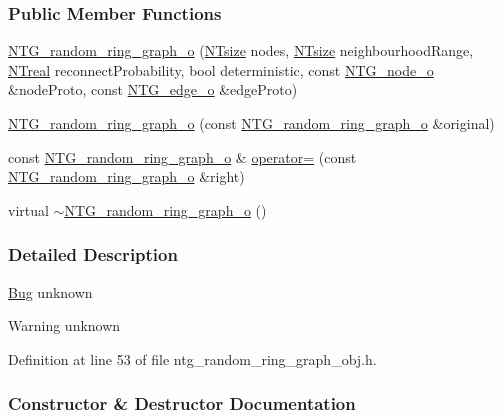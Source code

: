 \subsubsection*{Public Member Functions}
\begin{DoxyCompactItemize}
\item 
\hyperlink{class_n_t_g__random__ring__graph__o_ab5de716a3c0804ca6b107f7b12b6af8e}{NTG\_\-random\_\-ring\_\-graph\_\-o} (\hyperlink{nt__types_8h_a06c124f2e4469769b58230253ce0560b}{NTsize} nodes, \hyperlink{nt__types_8h_a06c124f2e4469769b58230253ce0560b}{NTsize} neighbourhoodRange, \hyperlink{nt__types_8h_a814a97893e9deb1eedcc7604529ba80d}{NTreal} reconnectProbability, bool deterministic, const \hyperlink{class_n_t_g__node__o}{NTG\_\-node\_\-o} \&nodeProto, const \hyperlink{class_n_t_g__edge__o}{NTG\_\-edge\_\-o} \&edgeProto)
\item 
\hyperlink{class_n_t_g__random__ring__graph__o_a62bd67aa5affbd0fdacbd0b218e8031a}{NTG\_\-random\_\-ring\_\-graph\_\-o} (const \hyperlink{class_n_t_g__random__ring__graph__o}{NTG\_\-random\_\-ring\_\-graph\_\-o} \&original)
\item 
const \hyperlink{class_n_t_g__random__ring__graph__o}{NTG\_\-random\_\-ring\_\-graph\_\-o} \& \hyperlink{class_n_t_g__random__ring__graph__o_a01841f81b33a6ed5ce26a164e6403a17}{operator=} (const \hyperlink{class_n_t_g__random__ring__graph__o}{NTG\_\-random\_\-ring\_\-graph\_\-o} \&right)
\item 
virtual \hyperlink{class_n_t_g__random__ring__graph__o_ad8043aeb166c5a790e8d4a3c222e6a20}{$\sim$NTG\_\-random\_\-ring\_\-graph\_\-o} ()
\end{DoxyCompactItemize}


\subsubsection{Detailed Description}
\begin{Desc}
\item[\hyperlink{bug__bug000090}{Bug}]unknown \end{Desc}
\begin{DoxyWarning}{Warning}
unknown 
\end{DoxyWarning}


Definition at line 53 of file ntg\_\-random\_\-ring\_\-graph\_\-obj.h.



\subsubsection{Constructor \& Destructor Documentation}
